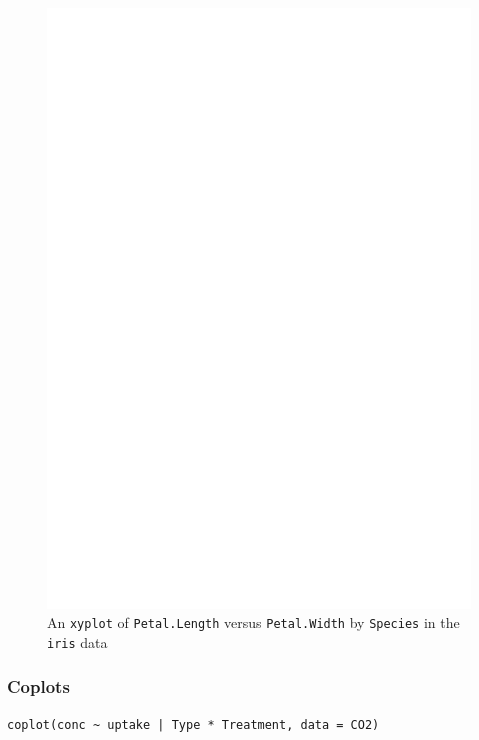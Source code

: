 \documentclass[captions=tableheading]{scrbook}
\begin{document}
\begin{figure}[th]
  \includegraphics[angle=270, totalheight=4in]{ps/xyplot.ps}
  \caption[An \texttt{xyplot} of \texttt{Petal.Length} versus \texttt{Petal.Width} by \texttt{Species}]{An \texttt{xyplot} of \texttt{Petal.Length} versus \texttt{Petal.Width} by \texttt{Species} in the \texttt{iris} data}
  \label{fig:xyplot}
\end{figure}
\subsubsection{Coplots}
\label{sec-2-6-3-4}



\begin{verbatim}
coplot(conc ~ uptake | Type * Treatment, data = CO2)
\end{verbatim}
\end{document}
